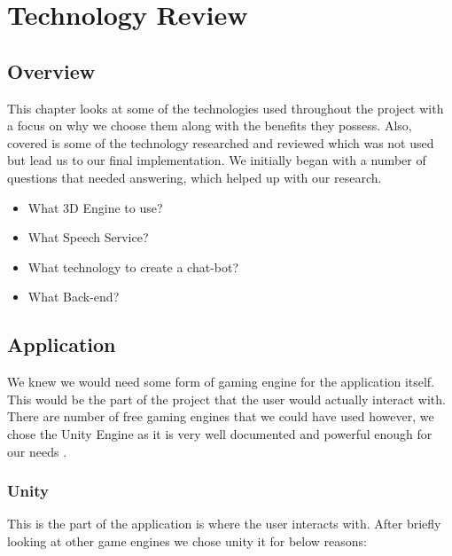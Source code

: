 \chapter{Technology Review}
\section{Overview}
This chapter looks at some of the technologies used throughout the project with a focus on why we choose them along with the benefits they possess. Also, covered is some of the technology researched and reviewed which was not used but lead us to our final implementation. We initially began with a number of questions that needed answering, which helped up with our research. 

\begin{itemize}
    \item What 3D Engine to use?
    \item What Speech Service?
    \item What technology to create a chat-bot?
    \item What Back-end?
\end{itemize}

\section{Application}
We knew we would need some form of gaming engine for the application itself. This would be the part of the project that the user would actually interact with. There are number of free gaming engines that we could have used however, we chose the Unity Engine as it is very well documented and powerful enough for our needs \cite{unity}.

\subsection{Unity}
This is the part of the application is where the user interacts with. After briefly looking at other game engines we chose unity it for below reasons:

